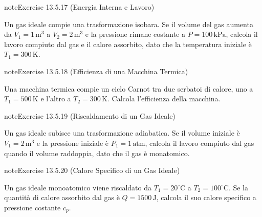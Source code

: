 \documentclass[letterpaper,10pt,italian]{jupyterBook}
\begin{document}
\begin{sphinxadmonition}{note}{Exercise 13.5.17 (Energia Interna e Lavoro)}



\sphinxAtStartPar
Un gas ideale compie una trasformazione isobara. Se il volume del gas aumenta da \(V_1 = 1 \, \text{m}^3\) a \(V_2 = 2 \, \text{m}^3\) e la pressione rimane costante a \(P = 100 \, \text{kPa}\), calcola il lavoro compiuto dal gas e il calore assorbito, dato che la temperatura iniziale è \(T_1 = 300 \, \text{K}\).
\end{sphinxadmonition}
 \label{exercise:ch/thermodynamics/foundation-problems-exercise-17}

\begin{sphinxadmonition}{note}{Exercise 13.5.18 (Efficienza di una Macchina Termica)}



\sphinxAtStartPar
Una macchina termica compie un ciclo Carnot tra due serbatoi di calore, uno a \(T_1 = 500 \, \text{K}\) e l’altro a \(T_2 = 300 \, \text{K}\). Calcola l’efficienza della macchina.
\end{sphinxadmonition}
 \label{exercise:ch/thermodynamics/foundation-problems-exercise-18}

\begin{sphinxadmonition}{note}{Exercise 13.5.19 (Riscaldamento di un Gas Ideale)}



\sphinxAtStartPar
Un gas ideale subisce una trasformazione adiabatica. Se il volume iniziale è \(V_1 = 2 \, \text{m}^3\) e la pressione iniziale è \(P_1 = 1 \, \text{atm}\), calcola il lavoro compiuto dal gas quando il volume raddoppia, dato che il gas è monatomico.
\end{sphinxadmonition}
 \label{exercise:ch/thermodynamics/foundation-problems-exercise-19}

\begin{sphinxadmonition}{note}{Exercise 13.5.20 (Calore Specifico di un Gas Ideale)}



\sphinxAtStartPar
Un gas ideale monoatomico viene riscaldato da \(T_1 = 20^\circ \text{C}\) a \(T_2 = 100^\circ \text{C}\). Se la quantità di calore assorbito dal gas è \(Q = 1500 \, \text{J}\), calcola il suo calore specifico a pressione costante \(c_p\).
\end{sphinxadmonition}
 \label{exercise:ch/thermodynamics/foundation-problems-exercise-20}
\end{document}
